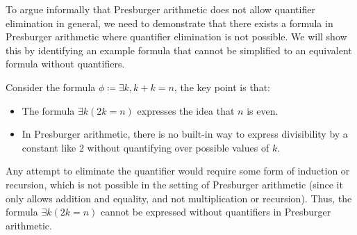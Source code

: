 To argue informally that Presburger arithmetic does not allow quantifier elimination in general, we need to demonstrate that there exists a formula in Presburger arithmetic where quantifier elimination is not possible. We will show this by identifying an example formula that cannot be simplified to an equivalent formula without quantifiers.

Consider the formula $\phi \coloneqq \exists k, k + k = n$, the key point is that:

\begin{itemize}
    \item The formula \( \exists k (2k = n) \) expresses the idea that \( n \) is even.
    \item In Presburger arithmetic, there is no built-in way to express divisibility by a constant like 2 without quantifying over possible values of \( k \).
\end{itemize}
Any attempt to eliminate the quantifier would require some form of induction or recursion, which is not possible in the setting of Presburger arithmetic (since it only allows addition and equality, and not multiplication or recursion).
Thus, the formula \( \exists k (2k = n) \) cannot be expressed without quantifiers in Presburger arithmetic.
